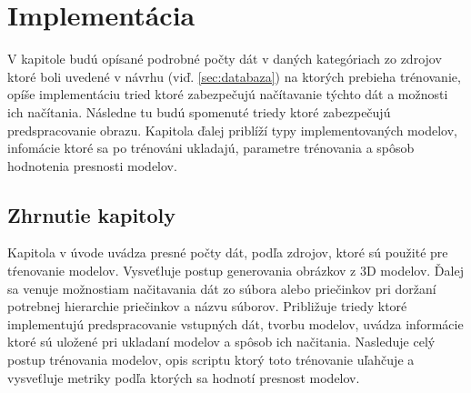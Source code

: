 
\chapter{Implementácia}

V kapitole budú opísané podrobné počty dát v daných kategóriach zo zdrojov ktoré boli uvedené v návrhu (viď. \ref{sec:databaza})
    na ktorých prebieha trénovanie, opíše implementáciu tried ktoré zabezpečujú načítavanie týchto dát a možnosti ich načítania.
Následne tu budú spomenuté triedy ktoré zabezpečujú predspracovanie obrazu.
Kapitola ďalej priblíží typy implementovaných modelov, infomácie ktoré sa po trénováni ukladajú, parametre trénovania a spôsob hodnotenia presnosti modelov.









\section{Zhrnutie kapitoly}

Kapitola v úvode uvádza presné počty dát, podľa zdrojov, ktoré sú použité pre tŕenovanie modelov.
Vysveťluje postup generovania obrázkov z 3D modelov.
Ďalej sa venuje možnostiam načitavania dát zo súbora alebo priečinkov pri doržaní potrebnej hierarchie priečinkov a názvu súborov.
Približuje triedy ktoré implementujú predspracovanie vstupných dát, tvorbu modelov, uvádza informácie ktoré sú uložené
    pri ukladaní modelov a spôsob ich načitania.
Nasleduje celý postup trénovania modelov, opis scriptu ktorý toto trénovanie uľahčuje a vysveťluje metriky podľa ktorých sa hodnotí presnost modelov.
